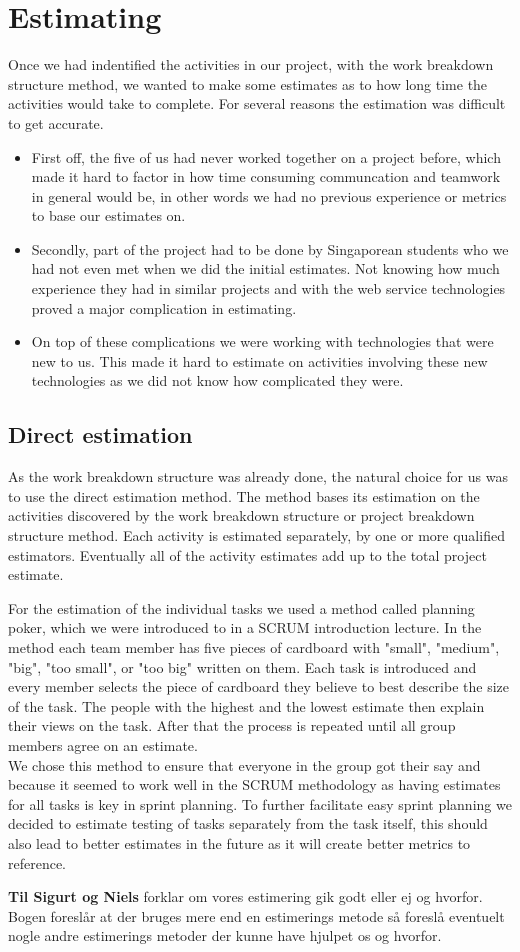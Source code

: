 \section{Estimating}
Once we had indentified the activities in our project, with the work breakdown structure method, we wanted to make some estimates as to how long time the activities would take to complete. For several reasons the estimation was difficult to get accurate.
\begin{itemize}
\item First off, the five of us had never worked together on a project before, which made it hard to factor in how time consuming communcation and teamwork in general would be, in other words we had no previous experience or metrics to base our estimates on. 

\item Secondly, part of the project had to be done by Singaporean students who we had not even met when we did the initial estimates. Not knowing how much experience they had in similar projects and with the web service technologies proved a major complication in estimating.

\item  On top of these complications we were working with technologies that were new to us. This made it hard to estimate on activities involving these new technologies as we did not know how complicated they were.

\end{itemize}
\subsection{Direct estimation}
As the work breakdown structure was already done, the natural choice for us was to use the direct estimation method\cite{caye}. The method bases its estimation on the activities discovered by the work breakdown structure or project breakdown structure method. Each activity is  estimated separately, by one or more qualified estimators. Eventually all of the activity estimates add up to the total project estimate. 

For the estimation of the individual tasks we used a method called planning poker, which we were introduced to in a SCRUM introduction lecture. In the method each team member has five pieces of cardboard with "small", "medium", "big", "too small", or "too big" written on them. Each task is introduced and every member selects the piece of cardboard they believe to best describe the size of the task. The people with the highest and the lowest estimate then explain their views on the task. After that the process is repeated until all group members agree on an estimate. \\
We chose this method to ensure that everyone in the group got their say and because it seemed to work well in the SCRUM methodology as having estimates for all tasks is key in sprint planning. To further facilitate easy sprint planning we decided to estimate testing of tasks separately from the task itself, this should also lead to better estimates in the future as it will create better metrics to reference.

\textbf{Til Sigurt og Niels}
forklar om vores estimering gik godt eller ej og hvorfor. Bogen foreslår at der bruges mere end en estimerings metode så foreslå eventuelt nogle andre estimerings metoder der kunne have hjulpet os og hvorfor.

